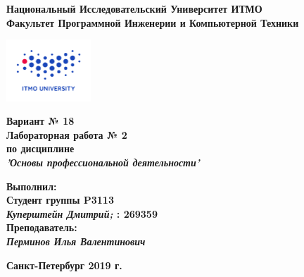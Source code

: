\documentclass[11pt,a4paper]{article}
\begin{document}
	\thispagestyle{empty}
	\begin{center}
		\textbf{Национальный Исследовательский Университет ИТМО}\\
		\textbf{Факультет Программной Инженерии и Компьютерной Техники}\\
	\end{center}
	\vspace{2em}
	\begin{center}
		\includegraphics[width=120px]{../../../itmo-logo.png}
	\end{center}
	\LARGE
	\vspace{5em}
	\begin{center}
		\textbf{Вариант № 18}\\
		\textbf{Лабораторная работа № 2}\\
		\Large
		\textbf{по дисциплине}\\
		\LARGE
		\textbf{\emph{'Основы профессиональной деятельности'}}\\
	\end{center}
	\vspace{11em}
	\large
	\begin{flushright}
		\textbf{Выполнил:}\\
		\textbf{Студент группы P3113}\\
		\textbf{\emph{Куперштейн Дмитрий;} : 269359}\\
		\textbf{Преподаватель:}\\
		\textbf{\emph{Перминов Илья Валентинович}}\\
	\end{flushright}
	\vspace{4em}
	\large
	\begin{center}
		\textbf{Санкт-Петербург 2019 г.}
	\end{center}
	\pagebreak{}
	\tableofcontents
	\pagebreak
\end{document}
